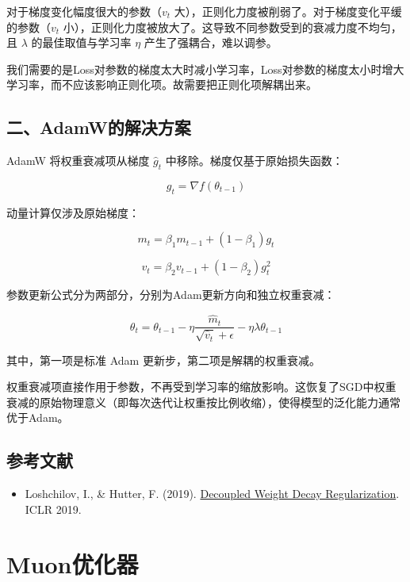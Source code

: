 对于梯度变化幅度很大的参数（\(v_t\) 大），正则化力度被削弱了。对于梯度变化平缓的参数（\(v_t\) 小），正则化力度被放大了。这导致不同参数受到的衰减力度不均匀，且 \(\lambda\) 的最佳取值与学习率 \(\eta\) 产生了强耦合，难以调参。

我们需要的是Loss对参数的梯度太大时减小学习率，Loss对参数的梯度太小时增大学习率，而不应该影响正则化项。故需要把正则化项解耦出来。

\hypertarget{ux4e8cadamwux7684ux89e3ux51b3ux65b9ux6848}{%
\subsection{二、AdamW的解决方案}\label{ux4e8cadamwux7684ux89e3ux51b3ux65b9ux6848}}

AdamW 将权重衰减项从梯度 \(\hat{g}_t\) 中移除。梯度仅基于原始损失函数：

\[
g_t = \nabla f(\theta_{t-1})
\]

动量计算仅涉及原始梯度：

\[
m_t = \beta_1m_{t-1} + (1-\beta_1)g_t
\]

\[
v_t = \beta_2v_{t-1} + (1-\beta_2)g_t^2
\]

参数更新公式分为两部分，分别为Adam更新方向和独立权重衰减：

\[
\theta_t = \theta_{t-1} - \eta\frac{\hat{m}_t}{\sqrt{\hat{v}_t}+\epsilon} - \eta\lambda\theta_{t-1}
\]

其中，第一项是标准 Adam 更新步，第二项是解耦的权重衰减。

权重衰减项直接作用于参数，不再受到学习率的缩放影响。这恢复了SGD中权重衰减的原始物理意义（即每次迭代让权重按比例收缩），使得模型的泛化能力通常优于Adam。

\hypertarget{ux53c2ux8003ux6587ux732e-27}{%
\subsection{参考文献}\label{ux53c2ux8003ux6587ux732e-27}}

\begin{itemize}
\tightlist
\item
  Loshchilov, I., \& Hutter, F. (2019). \href{https://arxiv.org/abs/1711.05101}{Decoupled Weight Decay Regularization}. ICLR 2019.
\end{itemize}

\clearpage

\hypertarget{muonux4f18ux5316ux5668}{%
\section{Muon优化器}\label{muonux4f18ux5316ux5668}}

